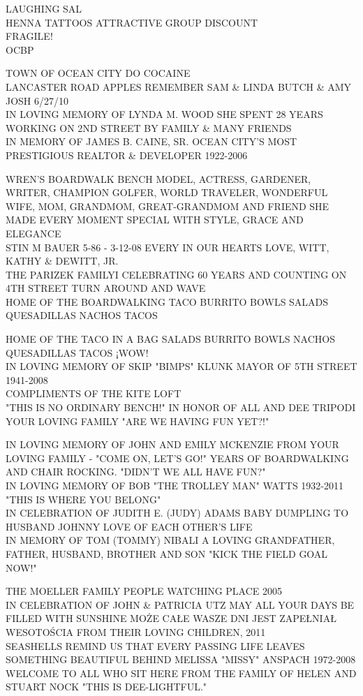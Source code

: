 \documentclass[10pt,letterpaper]{article}
\begin{document}
LAUGHING SAL\\
HENNA TATTOOS ATTRACTIVE GROUP DISCOUNT\\
FRAGILE!\\
OCBP

TOWN OF OCEAN CITY DO COCAINE\\
LANCASTER ROAD APPLES REMEMBER SAM \& LINDA BUTCH \& AMY JOSH 6/27/10\\
IN LOVING MEMORY OF LYNDA M. WOOD SHE SPENT 28 YEARS WORKING ON 2ND STREET BY FAMILY \& MANY FRIENDS\\
IN MEMORY OF JAMES B. CAINE, SR. OCEAN CITY'S MOST PRESTIGIOUS REALTOR \& DEVELOPER 1922{-}2006

WREN'S BOARDWALK BENCH MODEL, ACTRESS, GARDENER, WRITER, CHAMPION GOLFER, WORLD TRAVELER, WONDERFUL WIFE, MOM, GRANDMOM, GREAT{-}GRANDMOM AND FRIEND SHE MADE EVERY MOMENT SPECIAL WITH STYLE, GRACE AND ELEGANCE\\
STIN M BAUER 5{-}86 {-} 3{-}12{-}08 EVERY IN OUR HEARTS LOVE, WITT, KATHY \& DEWITT, JR.\\
THE PARIZEK FAMILYI CELEBRATING 60 YEARS AND COUNTING ON 4TH STREET TURN AROUND AND WAVE\\
HOME OF THE BOARDWALKING TACO BURRITO BOWLS SALADS QUESADILLAS NACHOS TACOS

HOME OF THE TACO IN A BAG SALADS BURRITO BOWLS NACHOS QUESADILLAS TACOS ¡WOW!\\
IN LOVING MEMORY OF SKIP "BIMPS" KLUNK MAYOR OF 5TH STREET 1941{-}2008\\
COMPLIMENTS OF THE KITE LOFT\\
"THIS IS NO ORDINARY BENCH!" IN HONOR OF ALL AND DEE TRIPODI YOUR LOVING FAMILY "ARE WE HAVING FUN YET?!"

IN LOVING MEMORY OF JOHN AND EMILY MCKENZIE FROM YOUR LOVING FAMILY {-} "COME ON, LET'S GO!"  YEARS OF BOARDWALKING AND CHAIR ROCKING.  "DIDN'T WE ALL HAVE FUN?"\\
IN LOVING MEMORY OF BOB "THE TROLLEY MAN" WATTS 1932{-}2011 "THIS IS WHERE YOU BELONG"\\
IN CELEBRATION OF JUDITH E. (JUDY) ADAMS BABY DUMPLING TO HUSBAND JOHNNY LOVE OF EACH OTHER'S LIFE\\
IN MEMORY OF TOM (TOMMY) NIBALI A LOVING GRANDFATHER, FATHER, HUSBAND, BROTHER AND SON "KICK THE FIELD GOAL NOW!"

THE MOELLER FAMILY PEOPLE WATCHING PLACE 2005\\
IN CELEBRATION OF JOHN \& PATRICIA UTZ MAY ALL YOUR DAYS BE FILLED WITH SUNSHINE MOŻE CAŁE WASZE DNI JEST ZAPEŁNIAŁ WESOTOŚCIA FROM THEIR LOVING CHILDREN, 2011\\
SEASHELLS REMIND US THAT EVERY PASSING LIFE LEAVES SOMETHING BEAUTIFUL BEHIND MELISSA "MISSY" ANSPACH 1972{-}2008\\
WELCOME TO ALL WHO SIT HERE FROM THE FAMILY OF HELEN AND STUART NOCK "THIS IS DEE{-}LIGHTFUL."
\end{document}
